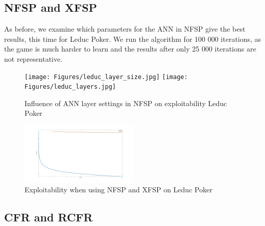 \documentclass[10pt,a4paper]{article}
\begin{document}
\subsection{NFSP and XFSP}
As before, we examine which parameters for the ANN in NFSP give the best results, this time for Leduc Poker. We run the algorithm for 100 000 iterations, as the game is much harder to learn and the results after only 25 000 iterations are not representative.

\begin{center}
\begin{figure}[h]
\label{fig:layers_kuhn}
\texttt{[image: Figures/leduc\_layer\_size.jpg]}
\texttt{[image: Figures/leduc\_layers.jpg]}
\caption{Influence of ANN layer settings in NFSP on exploitability Leduc Poker}
\end{figure}
\end{center}


\begin{center}
	\begin{figure}[h]
	\label{fig:layers_kuhn}
	\includegraphics[width=0.5\textwidth]{Figures/leduc_xfsp_nfsp.jpg}
	\caption{Exploitability when using NFSP and XFSP on Leduc Poker}
	\end{figure}
	\end{center}

\subsection{CFR and RCFR}
\end{document}

